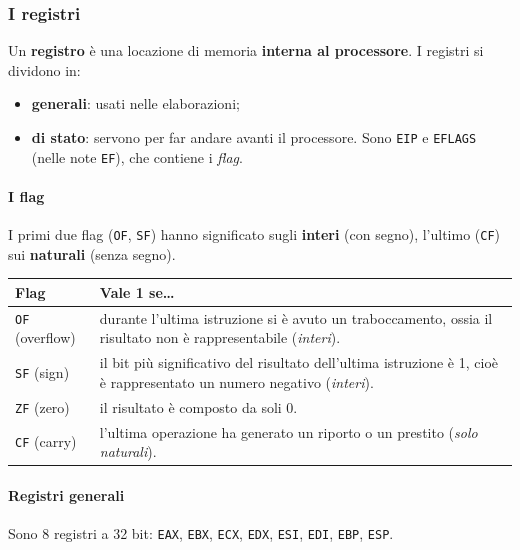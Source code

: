 \documentclass[11pt,a4paper]{article}
\begin{document}
\subsubsection*{I registri}

Un \textbf{registro} è una locazione di memoria \textbf{interna al processore}. I registri si dividono in:
\begin{itemize}[leftmargin=*]
  \item \textbf{generali}: usati nelle elaborazioni;
  \item \textbf{di stato}: servono per far andare avanti il processore. Sono \texttt{EIP} e \texttt{EFLAGS} (nelle note \texttt{EF}), che contiene i \emph{flag}.
\end{itemize}

\paragraph*{I flag}

I primi due flag (\texttt{OF}, \texttt{SF}) hanno significato sugli \textbf{interi} (con segno), l'ultimo (\texttt{CF}) sui \textbf{naturali} (senza segno).

\begin{center}
\begin{tabular}{l p{11cm}}
\textbf{Flag} & \textbf{Vale 1 se\ldots} \\ \hline
\texttt{OF} (overflow) & durante l'ultima istruzione si è avuto un traboccamento, ossia il risultato non è rappresentabile (\emph{interi}). \\
\texttt{SF} (sign) & il bit più significativo del risultato dell'ultima istruzione è 1, cioè è rappresentato un numero negativo (\emph{interi}). \\
\texttt{ZF} (zero) & il risultato è composto da soli 0. \\
\texttt{CF} (carry) & l'ultima operazione ha generato un riporto o un prestito (\emph{solo naturali}). \\
\end{tabular}
\end{center}

\paragraph*{Registri generali}

Sono 8 registri a 32 bit: \texttt{EAX}, \texttt{EBX}, \texttt{ECX}, \texttt{EDX}, \texttt{ESI}, \texttt{EDI}, \texttt{EBP}, \texttt{ESP}.
\end{document}
